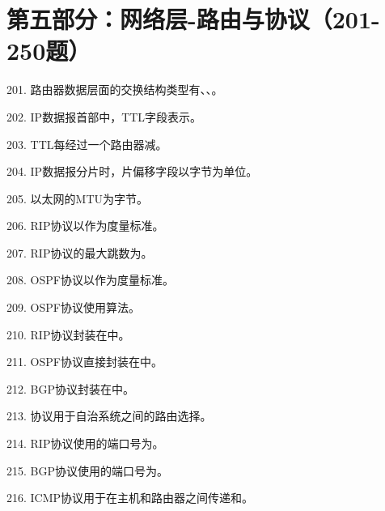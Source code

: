 \section{第五部分：网络层-路由与协议（201-250题）}

201. 路由器数据层面的交换结构类型有\underline{\hspace{2cm}}、\underline{\hspace{2cm}}、\underline{\hspace{2cm}}。

202. IP数据报首部中，TTL字段表示\underline{\hspace{2cm}}。

203. TTL每经过一个路由器减\underline{\hspace{1cm}}。

204. IP数据报分片时，片偏移字段以\underline{\hspace{2cm}}字节为单位。

205. 以太网的MTU为\underline{\hspace{2cm}}字节。

206. RIP协议以\underline{\hspace{2cm}}作为度量标准。

207. RIP协议的最大跳数为\underline{\hspace{2cm}}。

208. OSPF协议以\underline{\hspace{2cm}}作为度量标准。

209. OSPF协议使用\underline{\hspace{2cm}}算法。

210. RIP协议封装在\underline{\hspace{2cm}}中。

211. OSPF协议直接封装在\underline{\hspace{2cm}}中。

212. BGP协议封装在\underline{\hspace{2cm}}中。

213. \underline{\hspace{2cm}}协议用于自治系统之间的路由选择。

214. RIP协议使用的端口号为\underline{\hspace{2cm}}。

215. BGP协议使用的端口号为\underline{\hspace{2cm}}。

216. ICMP协议用于在主机和路由器之间传递\underline{\hspace{2cm}}和\underline{\hspace{2cm}}。

